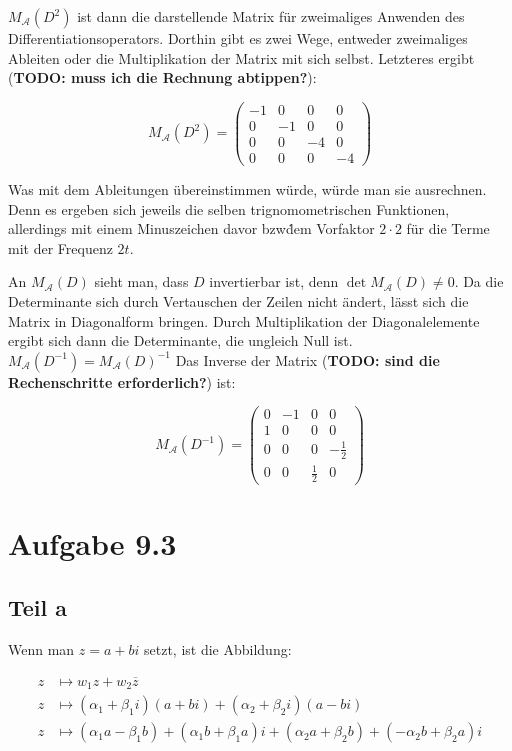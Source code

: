 \documentclass[a4paper,german,12pt,smallheadings]{scrartcl}
\begin{document}
$M_{\mathcal{A}}(D^2)$ ist dann die darstellende Matrix für zweimaliges
Anwenden des Differentiationsoperators. Dorthin gibt es zwei Wege, entweder
zweimaliges Ableiten oder die Multiplikation der Matrix mit sich selbst.
Letzteres ergibt (\textbf{TODO: muss ich die Rechnung abtippen?}):

\begin{equation}
  M_{\mathcal{A}}(D^2) = \begin{pmatrix}-1 & 0 & 0 & 0 \\ 0 & -1 & 0 & 0 \\ 0 & 0 & -4 & 0 \\ 0 & 0 & 0 & -4\end{pmatrix}
\end{equation}

Was mit dem Ableitungen übereinstimmen würde, würde man sie ausrechnen. Denn es
ergeben sich jeweils die selben trignomometrischen Funktionen, allerdings mit
einem Minuszeichen davor bzw\. dem Vorfaktor $2 \cdot 2$ für die Terme mit der
Frequenz $2t$.

An $M_{\mathcal{A}}(D)$ sieht man, dass $D$ invertierbar ist, denn $\det
M_{\mathcal{A}}(D) \neq 0$. Da die Determinante sich durch Vertauschen der
Zeilen nicht ändert, lässt sich die Matrix in Diagonalform bringen. Durch
Multiplikation der Diagonalelemente ergibt sich dann die Determinante, die
ungleich Null ist. $M_{\mathcal{A}}(D^{-1}) = M_{\mathcal{A}}(D)^{-1}$  Das
Inverse der Matrix (\textbf{TODO: sind die Rechenschritte erforderlich?}) ist:

\begin{equation}
  M_{\mathcal{A}}(D^{-1}) = \begin{pmatrix}0 & -1 & 0 & 0 \\ 1 & 0 & 0 & 0 \\ 0 & 0 & 0 & -\frac{1}{2} \\ 0 & 0 & \frac{1}{2} & 0\end{pmatrix}
\end{equation}

\section*{Aufgabe 9.3}
\subsection*{Teil a}
Wenn man $z = a+bi$ setzt, ist die Abbildung:

\begin{align*}
  z &\mapsto w_1z + w_2\overline{z} \\
  z &\mapsto (\alpha_1 + \beta_1i)(a+bi) + (\alpha_2+\beta_2i)(a-bi) \\
  z &\mapsto (\alpha_1a-\beta_1b) + (\alpha_1b + \beta_1a)i + (\alpha_2a+\beta_2b)+(-\alpha_2b+\beta_2a)i
\end{align*}
\end{document}
